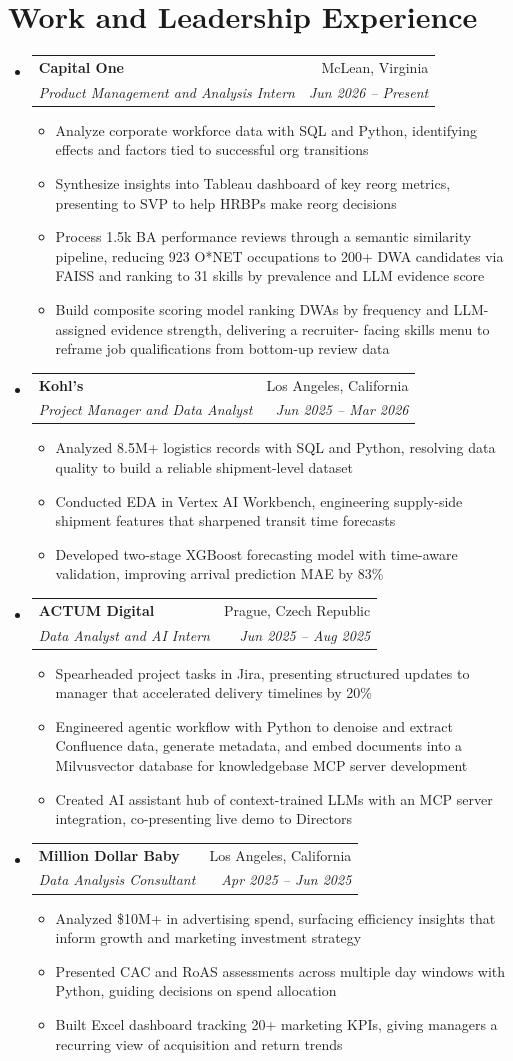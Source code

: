 \documentclass[letterpaper,11pt]{article}
\makeatletter
\newcommand{\resumeItem}[1]{
  \item\small{#1}
}
\newcommand{\resumeSubheading}[4]{
  \vspace{-2pt}\item
    \begin{tabular*}{\textwidth}[t]{l@{\extracolsep{\fill}}r}
      \textbf{#1} & #2 \\
      \textit{\small#3} & \textit{\small #4} \\
    \end{tabular*}\vspace{-7pt}
}
\newcommand{\resumeSubHeadingListStart}{\begin{itemize}[leftmargin=0in, label={}]}
\newcommand{\resumeSubHeadingListEnd}{\end{itemize}}
\newcommand{\resumeItemListStart}{\begin{itemize}[itemsep= 1.5pt, parsep=0pt]}
\newcommand{\resumeItemListEnd}{\end{itemize}\vspace{-5pt}}
\makeatother
\begin{document}
\section{Work and Leadership Experience}
  \resumeSubHeadingListStart
    \resumeSubheading
      {Capital One}{McLean, Virginia}
      {Product Management and Analysis Intern}{Jun 2026 -- Present}
      \resumeItemListStart
        \resumeItem{Analyze corporate workforce data with SQL and Python, identifying effects and factors tied to successful org transitions}
        \resumeItem{Synthesize insights into Tableau dashboard of key reorg metrics, presenting to SVP to help HRBPs make reorg decisions}
        \resumeItem{Process 1.5k BA performance reviews through a semantic similarity pipeline, reducing 923 O*NET occupations to 200+ DWA candidates via FAISS and ranking to 31 skills by prevalence and LLM evidence score}
        \resumeItem{Build composite scoring model ranking DWAs by frequency and LLM-assigned evidence strength, delivering a recruiter- facing skills menu to reframe job qualifications from bottom-up review data}
      \resumeItemListEnd
    \resumeSubheading
      {Kohl's}{Los Angeles, California}
      {Project Manager and Data Analyst}{Jun 2025 -- Mar 2026}
      \resumeItemListStart
        \resumeItem{Analyzed 8.5M+ logistics records with SQL and Python, resolving data quality to build a reliable shipment-level dataset}
        \resumeItem{Conducted EDA in Vertex AI Workbench, engineering supply-side shipment features that sharpened transit time forecasts}
        \resumeItem{Developed two-stage XGBoost forecasting model with time-aware validation, improving arrival prediction MAE by 83\%}
      \resumeItemListEnd
    \resumeSubheading
      {ACTUM Digital}{Prague, Czech Republic}
      {Data Analyst and AI Intern}{Jun 2025 -- Aug 2025}
      \resumeItemListStart
        \resumeItem{Spearheaded project tasks in Jira, presenting structured updates to manager that accelerated delivery timelines by 20\%}
        \resumeItem{Engineered agentic workflow with Python to denoise and extract Confluence data, generate metadata, and embed documents into a Milvusvector database for knowledgebase MCP server development}
        \resumeItem{Created AI assistant hub of context-trained LLMs with an MCP server integration, co-presenting live demo to Directors}
      \resumeItemListEnd
    \resumeSubheading
      {Million Dollar Baby}{Los Angeles, California}
      {Data Analysis Consultant}{Apr 2025 -- Jun 2025}
      \resumeItemListStart
        \resumeItem{Analyzed \$10M+ in advertising spend, surfacing efficiency insights that inform growth and marketing investment strategy}
        \resumeItem{Presented CAC and RoAS assessments across multiple day windows with Python, guiding decisions on spend allocation}
        \resumeItem{Built Excel dashboard tracking 20+ marketing KPIs, giving managers a recurring view of acquisition and return trends}
      \resumeItemListEnd
  \resumeSubHeadingListEnd
\end{document}

